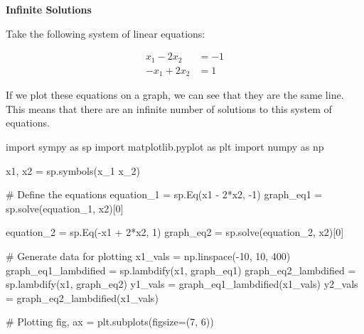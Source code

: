 \documentclass[
  letterpaper,
  DIV=11,
  numbers=noendperiod]{scrreprt}
\newenvironment{Shaded}{\begin{snugshade}}{\end{snugshade}}
\newcommand{\CommentTok}[1]{\textcolor[rgb]{0.37,0.37,0.37}{#1}}
\newcommand{\DecValTok}[1]{\textcolor[rgb]{0.68,0.00,0.00}{#1}}
\newcommand{\ImportTok}[1]{\textcolor[rgb]{0.00,0.46,0.62}{#1}}
\newcommand{\NormalTok}[1]{\textcolor[rgb]{0.00,0.23,0.31}{#1}}
\newcommand{\OperatorTok}[1]{\textcolor[rgb]{0.37,0.37,0.37}{#1}}
\newcommand{\StringTok}[1]{\textcolor[rgb]{0.13,0.47,0.30}{#1}}
\begin{document}
\textbf{Infinite Solutions}

Take the following system of linear equations:

\[
\begin{align*}
x_1 - 2x_2 &= -1\\
-x_1 + 2x_2 &= 1
\end{align*}
\]

If we plot these equations on a graph, we can see that they are the same
line. This means that there are an infinite number of solutions to this
system of equations.

\begin{Shaded}
\begin{Highlighting}[]
\ImportTok{import}\NormalTok{ sympy }\ImportTok{as}\NormalTok{ sp}
\ImportTok{import}\NormalTok{ matplotlib.pyplot }\ImportTok{as}\NormalTok{ plt}
\ImportTok{import}\NormalTok{ numpy }\ImportTok{as}\NormalTok{ np}

\NormalTok{x1, x2 }\OperatorTok{=}\NormalTok{ sp.symbols(}\StringTok{\textquotesingle{}x\_1 x\_2\textquotesingle{}}\NormalTok{)}

\CommentTok{\# Define the equations}
\NormalTok{equation\_1 }\OperatorTok{=}\NormalTok{ sp.Eq(x1 }\OperatorTok{{-}} \DecValTok{2}\OperatorTok{*}\NormalTok{x2, }\OperatorTok{{-}}\DecValTok{1}\NormalTok{)}
\NormalTok{graph\_eq1 }\OperatorTok{=}\NormalTok{ sp.solve(equation\_1, x2)[}\DecValTok{0}\NormalTok{]}

\NormalTok{equation\_2 }\OperatorTok{=}\NormalTok{ sp.Eq(}\OperatorTok{{-}}\NormalTok{x1 }\OperatorTok{+} \DecValTok{2}\OperatorTok{*}\NormalTok{x2, }\DecValTok{1}\NormalTok{)}
\NormalTok{graph\_eq2 }\OperatorTok{=}\NormalTok{ sp.solve(equation\_2, x2)[}\DecValTok{0}\NormalTok{]}

\CommentTok{\# Generate data for plotting}
\NormalTok{x1\_vals }\OperatorTok{=}\NormalTok{ np.linspace(}\OperatorTok{{-}}\DecValTok{10}\NormalTok{, }\DecValTok{10}\NormalTok{, }\DecValTok{400}\NormalTok{)}
\NormalTok{graph\_eq1\_lambdified }\OperatorTok{=}\NormalTok{ sp.lambdify(x1, graph\_eq1)}
\NormalTok{graph\_eq2\_lambdified }\OperatorTok{=}\NormalTok{ sp.lambdify(x1, graph\_eq2)}
\NormalTok{y1\_vals }\OperatorTok{=}\NormalTok{ graph\_eq1\_lambdified(x1\_vals)}
\NormalTok{y2\_vals }\OperatorTok{=}\NormalTok{ graph\_eq2\_lambdified(x1\_vals)}

\CommentTok{\# Plotting}
\NormalTok{fig, ax }\OperatorTok{=}\NormalTok{ plt.subplots(figsize}\OperatorTok{=}\NormalTok{(}\DecValTok{7}\NormalTok{, }\DecValTok{6}\NormalTok{))}


\end{Highlighting}
\end{Shaded}
\end{document}
